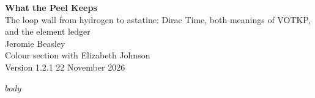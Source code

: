 \documentclass[11pt]{article}
\begin{document}
\begin{center}{\LARGE\bfseries What the Peel Keeps}\\[4pt]{\large The loop wall from hydrogen to astatine: Dirac Time, both meanings of VOTKP, and the element ledger}\\[10pt]{\large Jeromie Beasley}\\[2pt]{\small Colour section with Elizabeth Johnson}\\[2pt]{\small Version 1.2.1 \textperiodcentered{} 22 November 2026}\end{center}\vspace{6pt}
$body$
\end{document}
